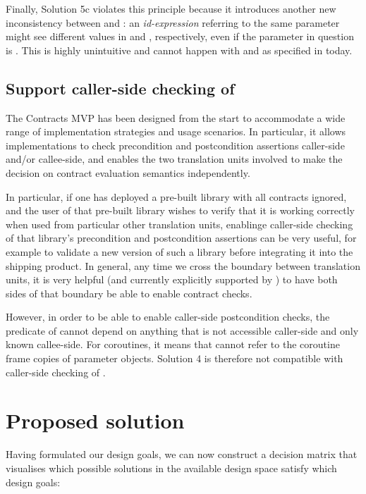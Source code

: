 Finally, Solution 5c violates this principle because it introduces another new inconsistency between  and : an \emph{id-expression} referring to the same parameter might see different values in  and , respectively, even if the parameter in question is . This is highly unintuitive and cannot happen with  and  as specified in \cite{P2900R8} today.

\subsection{Support caller-side checking of }

The Contracts MVP has been designed from the start to accommodate a wide range of implementation strategies and usage scenarios. In particular, it allows implementations to check precondition and postcondition assertions caller-side and/or callee-side, and enables the two translation units involved to make the decision on contract evaluation semantics independently.

In particular, if one has deployed a pre-built library with all contracts ignored, and the user of that pre-built library wishes to verify that it is working correctly when used from particular other translation units, enablinge caller-side checking of that library's precondition and postcondition assertions can be very useful, for example to validate a new version of such a library before integrating it into the shipping product. In general, any time we cross the boundary between translation units, it is very helpful (and currently explicitly supported by \cite{P2900R8}) to have both sides of that boundary be able to enable contract checks.

However, in order to be able to enable caller-side postcondition checks, the predicate of  cannot depend on anything that is not accessible caller-side and only known callee-side. For coroutines, it means that  cannot refer to the coroutine frame copies of parameter objects. Solution 4 is therefore not compatible with caller-side checking of .

\section{Proposed solution}

Having formulated our design goals, we can now construct a decision matrix that visualises which possible solutions in the available design space satisfy which design goals:


